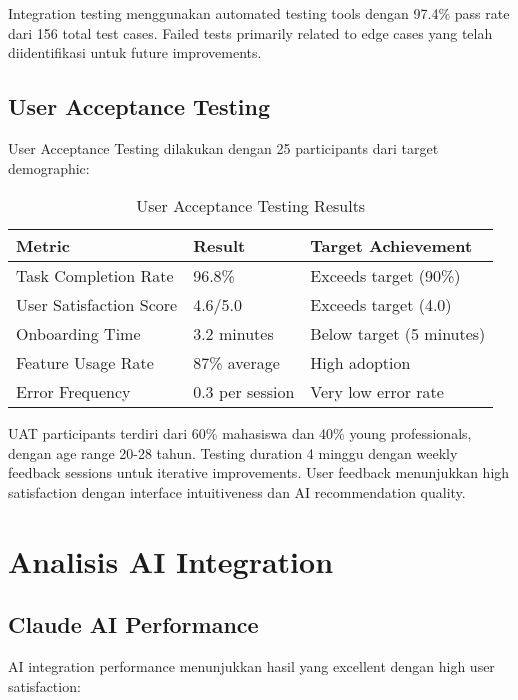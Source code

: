 Integration testing menggunakan automated testing tools dengan 97.4\% pass rate dari 156 total test cases. Failed tests primarily related to edge cases yang telah diidentifikasi untuk future improvements.

\subsection{User Acceptance Testing}

User Acceptance Testing dilakukan dengan 25 participants dari target demographic:

\begin{table}[ht]
\centering
\caption{User Acceptance Testing Results}
\label{tab:uat-results}
\footnotesize
\begin{adjustbox}{width=\textwidth,center}
\begin{tabular}{@{}p{4cm}p{3cm}p{6cm}@{}}
\toprule
\textbf{Metric} & \textbf{Result} & \textbf{Target Achievement} \\
\midrule
Task Completion Rate & 96.8\% & Exceeds target (90\%) \\
\hline
User Satisfaction Score & 4.6/5.0 & Exceeds target (4.0) \\
\hline
Onboarding Time & 3.2 minutes & Below target (5 minutes) \\
\hline
Feature Usage Rate & 87\% average & High adoption \\
\hline
Error Frequency & 0.3 per session & Very low error rate \\
\bottomrule
\end{tabular}
\end{adjustbox}
\end{table}

UAT participants terdiri dari 60\% mahasiswa dan 40\% young professionals, dengan age range 20-28 tahun. Testing duration 4 minggu dengan weekly feedback sessions untuk iterative improvements. User feedback menunjukkan high satisfaction dengan interface intuitiveness dan AI recommendation quality.

\section{Analisis AI Integration}

\subsection{Claude AI Performance}

AI integration performance menunjukkan hasil yang excellent dengan high user satisfaction:

